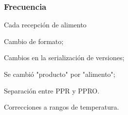 \subsubsection{Frecuencia}

Cada recepción de \gls{alimento}

\begin{changelog}[title=Registro de cambios,simple, sectioncmd=\subsection*,]
	\begin{version}[v=2.0, date=2023--01, author=Pablo E. Alanis]
			\item Cambio de formato;
			\item Cambios en la serialización de versiones;
			\item Se cambió "producto" por "alimento";

			\item Separación entre PPR y PPRO.
		\end{version}

	\begin{shortversion}[v=2.1, date=2023--07, author=Pablo E. Alanis,label=changelog-\thesection-\MayorVer.\MenorVer]
		\item Correcciones a rangos de temperatura.
	\end{shortversion}
\end{changelog}